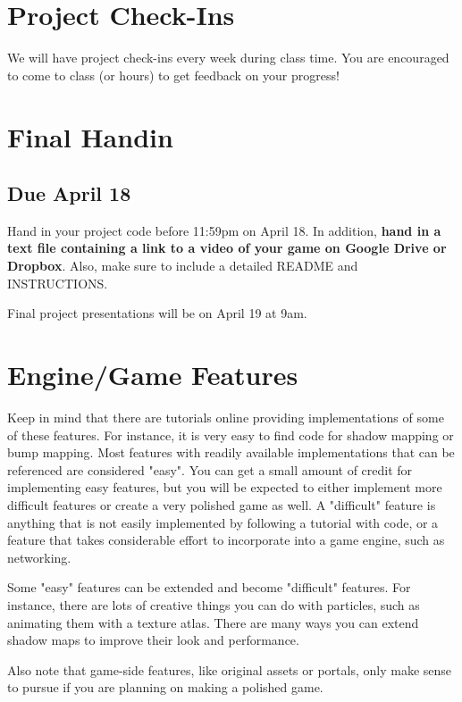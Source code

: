 \documentclass{../cs195u}
\begin{document}
\section*{Project Check-Ins}

We will have project check-ins every week during class time. You are encouraged to come to class (or hours) to get feedback on your progress!
 
\section*{Final Handin}
\subsection*{Due April 18}

Hand in your project code before 11:59pm on April 18. In addition, \textbf{hand in a text file containing a link to a video of your game on Google Drive or Dropbox}. Also, make sure to include a detailed README and INSTRUCTIONS.  

Final project presentations will be on April 19 at 9am.

\section*{Engine/Game Features}

Keep in mind that there are tutorials online providing implementations of some of these features. For instance, it is very easy to find code for shadow mapping or bump mapping. Most features with readily available implementations that can be referenced are considered "easy". You can get a small amount of credit for implementing easy features, but you will be expected to either implement more difficult features or create a very polished game as well. A "difficult" feature is anything that is not easily implemented by following a tutorial with code, or a feature that takes considerable effort to incorporate into a game engine, such as networking. 

Some "easy" features can be extended and become "difficult" features. For instance, there are lots of creative things you can do with particles, such as animating them with a texture atlas. There are many ways you can extend shadow maps to improve their look and performance.

Also note that game-side features, like original assets or portals, only make sense to pursue if you are planning on making a polished game.
\end{document}
